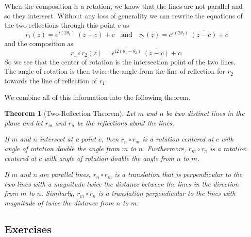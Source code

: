 \documentclass[
]{book}
\newtheorem{theorem}{Theorem}[chapter]
\theoremstyle{definition}
\theoremstyle{definition}
\theoremstyle{definition}
\theoremstyle{definition}
\theoremstyle{remark}
\begin{document}
When the composition is a rotation, we know that the lines are not parallel and so they intersect. Without any loss of generality we can rewrite the equations of the two reflections through this point \(c\) as
\[r_1(z) = e^{i (2\theta_1)} \: \overline{(z-c)} +c \quad \mbox{and} \quad r_2(z) = e^{i (2\theta_2)} \: \overline{(z-c)} + c\]
and the composition as \[r_1 \circ r_2 (z) = e^{i2(\theta_1-\theta_2)} \: \overline{(z-c)} +c.\]
So we see that the center of rotation is the intersection point of the two lines. The angle of rotation is then twice the angle from the line of reflection for \(r_2\) towards the line of reflection of \(r_1\).

We combine all of this information into the following theorem.

\begin{theorem}[Two-Reflection Theorem]
Let \(m\) and \(n\) be two distinct lines in the plane and let \(r_m\) and \(r_n\) be the reflections about the lines.

If \(m\) and \(n\) intersect at a point \(c\), then \(r_n\circ r_m\) is a rotation centered at \(c\) with angle of rotation double the angle from \(m\) to \(n\). Furthermore, \(r_m \circ r_n\) is a rotation centered at \(c\) with angle of rotation double the angle from \(n\) to \(m\).

If \(m\) and \(n\) are parallel lines, \(r_n\circ r_m\) is a translation that is perpendicular to the two lines with a magnitude twice the distance between the lines in the direction from \(m\) to \(n\). Similarly, \(r_m \circ r_n\) is a translation perpendicular to the lines with magnitude of twice the distance from \(n\) to \(m\).
\end{theorem}

\hypertarget{exercises-55}{%
\subsection{Exercises}\label{exercises-55}}
\end{document}
